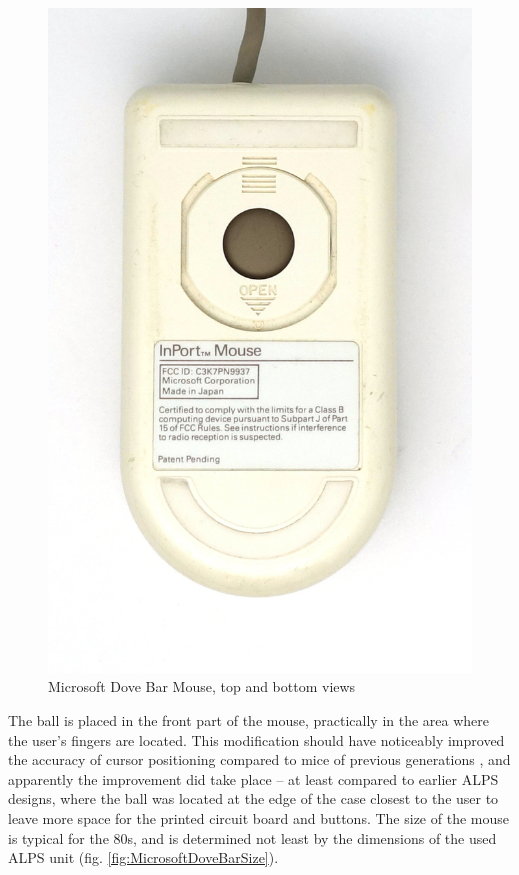 \documentclass[11pt, a4paper]{article}
\begin{document}
\begin{figure}[h]
    \includegraphics[scale=0.5]{1987_microsoft_dove_bar_mouse/bottom_30.jpg}
    \caption{Microsoft Dove Bar Mouse, top and bottom views}
    \label{fig:MicrosoftDoveBarTopAndBottom}
\end{figure}

The ball is placed in the front part of the mouse, practically in the area where the user's fingers are located. This modification should have noticeably improved the accuracy of cursor positioning compared to mice of previous generations \cite{atkinson}, and apparently the improvement did take place -- at least compared to earlier ALPS  designs, where the ball was located at the edge of the case closest to the user to leave more space for the printed circuit board and buttons. The size of the mouse is typical for the 80s, and is determined not least by the dimensions of the used ALPS unit (fig. \ref{fig:MicrosoftDoveBarSize}). 
\end{document}
